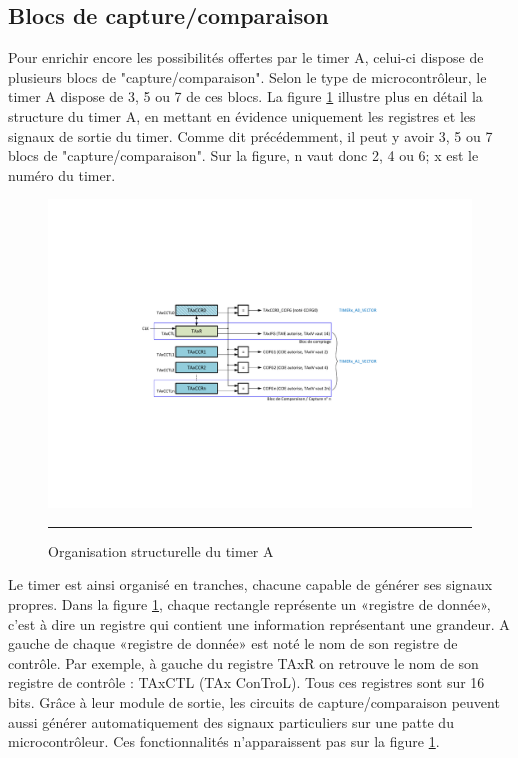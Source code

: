 \subsection{Blocs de capture/comparaison}
Pour enrichir encore les possibilités offertes par le timer A, celui-ci dispose de plusieurs blocs de "capture/comparaison". Selon le type de microcontrôleur, le timer A dispose de 3, 5 ou 7 de ces blocs.
La figure \ref{fig:TimerAstruct} illustre plus en détail la structure du timer A, en mettant en évidence uniquement les registres et les signaux de sortie du timer. Comme dit précédemment, il peut y avoir 3, 5 ou 7 blocs de "capture/comparaison". Sur la figure, n vaut donc 2, 4 ou 6; x est le numéro du timer.

\begin{figure}[H]
  \centering
  \includegraphics[angle=0, width=15cm]{./Figures/Chap5_Timer/Timer_blocs_3.pdf}
  \rule{35em}{0.5pt}
  \caption[Structure TimerA]{Organisation structurelle du timer A}
  \label{fig:TimerAstruct}
\end{figure}

Le timer est ainsi organisé en tranches, chacune capable de générer ses signaux propres. Dans la figure \ref{fig:TimerAstruct}, chaque rectangle représente un «registre de donnée», c'est à dire un registre qui contient une information représentant une grandeur.
A gauche de chaque «registre de donnée» est noté le nom de son registre de contrôle. Par exemple, à gauche du registre TAxR on retrouve le nom de son registre de contrôle : TAxCTL (TAx ConTroL). Tous ces registres sont sur 16 bits.
Grâce à leur module de sortie, les circuits de capture/comparaison peuvent aussi générer automatiquement des signaux particuliers sur une patte du microcontrôleur. Ces fonctionnalités n'apparaissent pas sur la figure \ref{fig:TimerAstruct}.

